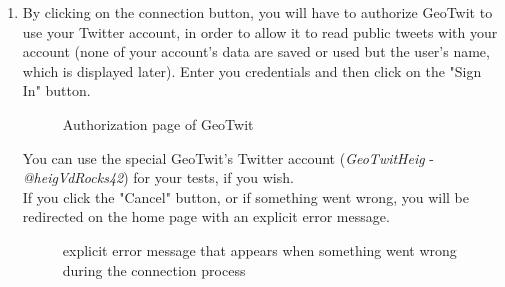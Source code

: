 \documentclass[a4paper,11pt]{report}
\begin{document}
\begin{enumerate}
	\item By clicking on the connection button, you will have to authorize GeoTwit to use your Twitter account, in order to allow it to read public tweets with your account (none of your account's data are saved or used but the user's name, which is displayed later). Enter you credentials and then click on the "Sign In" button.
	\begin{figure}[H]
	\vspace{-5pt}
	\begin{center}
	\vspace{-5pt}
	\caption{Authorization page of GeoTwit}
	\end{center}
	\end{figure}
	\vspace{-10pt}
	You can use the special GeoTwit's Twitter account (\emph{GeoTwitHeig} - \emph{@heigVdRocks42}) for your tests, if you wish.\\
	
	If you click the "Cancel" button, or if something went wrong, you will be redirected on the home page with an explicit error message.
	\begin{figure}[H]
	\vspace{-5pt}
	\begin{center}
	\vspace{-5pt}
	\caption{explicit error message that appears when something went wrong during the connection process}
	\end{center}
	\end{figure}
	\vspace{-10pt}
\end{enumerate}
\end{document}
